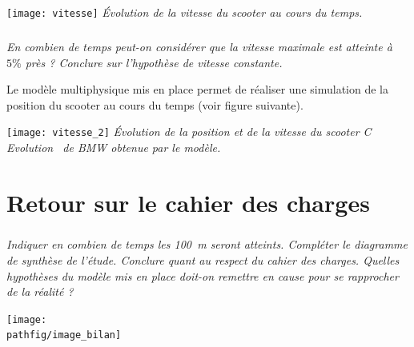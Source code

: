 \documentclass[10pt,fleqn]{article} %
\begin{document}
\begin{multicols}{2}
\begin{center}
\texttt{[image: vitesse]}
\textit{\'Evolution de la vitesse du scooter au cours du temps.}
\end{center}

\subparagraph{}\textit{En combien de temps peut-on considérer que la vitesse maximale est atteinte à $5 \%$ près ? Conclure sur l'hypothèse de vitesse constante.}





Le modèle multiphysique mis en place permet de réaliser une simulation de la position du scooter au cours du temps (voir figure suivante).%
%
%


\begin{center}
\texttt{[image: vitesse\_2]}
\textit{\'Evolution de la position et de la vitesse du scooter C Evolution\textregistered ~ de BMW obtenue par le modèle.}
\end{center}
\section*{Retour sur le cahier des charges}

\subparagraph{}\textit{Indiquer en combien de temps les \SI{100}{m} seront atteints. Compléter le diagramme de synthèse de l'étude. Conclure quant au respect du cahier des charges. Quelles hypothèses du modèle mis en place doit-on remettre en cause pour se rapprocher de la réalité ?}








\end{multicols}
{\centering\texttt{[image: \\pathfig/image\_bilan]}\par}
\end{document}

